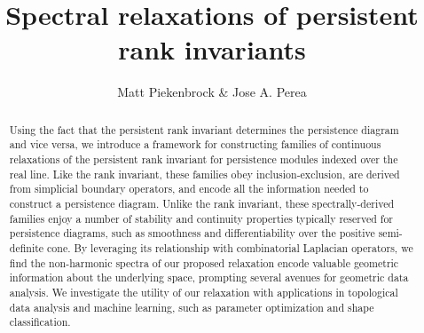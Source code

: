 \documentclass[10pt]{article}
\title{\vspace{-2.0em} 
Spectral relaxations of persistent rank invariants
\vspace{-0.5em}}
\author{Matt Piekenbrock \& Jose A. Perea}
\date{}
\numberwithin{equation}{section}
\newcommand{\+}{%
	\raisebox{0.18ex}{\scaleobj{0.55}{+}}
}
\theoremstyle{definition}
\theoremstyle{definition}
\begin{document}
\maketitle

\begin{abstract}
Using the fact that the persistent rank invariant determines the persistence diagram and vice versa, we introduce a framework for constructing families of continuous relaxations of the persistent rank invariant for persistence modules indexed over the real line. 
Like the rank invariant, these families obey inclusion-exclusion, are derived from simplicial boundary operators, and encode all the information needed to construct a persistence diagram. 
Unlike the rank invariant, these spectrally-derived families enjoy a number of stability and continuity properties typically reserved for persistence diagrams, such as smoothness and differentiability over the positive semi-definite cone. 
By leveraging its relationship with combinatorial Laplacian operators, we find the non-harmonic spectra of our proposed relaxation encode valuable geometric information about the underlying space, prompting several avenues for geometric data analysis.
We investigate the utility of our relaxation with applications in topological data analysis and machine learning, such as parameter optimization and shape classification.

\end{abstract}
\end{document}
